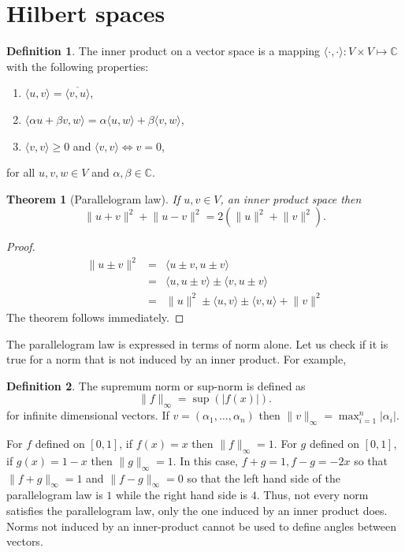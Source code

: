 \documentclass{article}
\theoremstyle{plain}
\newtheorem{thm}{Theorem}
\numberwithin{thm}{section}
\theoremstyle{plain}
\numberwithin{prop}{section}
\theoremstyle{definition}
\newtheorem{defn}{Definition}
\numberwithin{defn}{section}
\theoremstyle{remark}
\numberwithin{equation}{section}
\begin{document}
\section{Hilbert spaces}\label{s3}
\begin{defn}\label{s3d1}
The inner product on a vector space is a mapping $\langle\cdot,\cdot\rangle:
V \times V \mapsto \mathbb{C}$ with the following properties:
\begin{enumerate}
\item $\langle u, v\rangle = \overline{\langle v, u\rangle}$,
\item $\langle \alpha u + \beta v, w\rangle = \alpha\langle u, w\rangle +
\beta\langle v, w\rangle$,
\item $\langle v, v\rangle \ge 0$ and $\langle v, v\rangle \Leftrightarrow v=0$,
\end{enumerate}
for all $u, v, w \in V$ and $\alpha, \beta \in \mathbb{C}$.
\end{defn}

\begin{thm}[Parallelogram law]\label{s3t1}
If $u, v \in V$, an inner product space then
\[
\lVert u + v \rVert^2 + \lVert u - v\rVert^2 = 2(\lVert u \rVert^2 + \lVert v
\rVert^2).
\]
\end{thm}
\begin{proof}
\begin{eqnarray*}
\lVert u \pm v \rVert^2 &=& \langle u \pm v, u \pm v\rangle \\
 &=& \langle u, u \pm v \rangle \pm \langle v, u \pm v\rangle \\
 &=& \lVert u \rVert^2 \pm \langle u, v\rangle \pm \langle v, u\rangle +
     \lVert v \rVert^2
\end{eqnarray*}     
The theorem follows immediately.
\end{proof}

The parallelogram law is expressed in terms of norm alone. Let us check if it
is true for a norm that is not induced by an inner product. For example,
\begin{defn}\label{s3d2}
The supremum norm or sup-norm is defined as 
\[
\lVert f \rVert_\infty = \sup(|f(x)|).
\]
for infinite dimensional vectors. If $v = (\alpha_1, \ldots, \alpha_n)$ then
$\lVert v \rVert_\infty = \max_{i=1}^n|\alpha_i|$.
\end{defn}
For $f$ defined on $[0, 1]$, if $f(x) = x$ then $\lVert f \rVert_\infty = 1$.
For $g$ defined on $[0, 1]$, if $g(x) = 1-x$ then $\lVert g \rVert_\infty = 1$.
In this case, $f + g = 1, f - g = -2x$ so that $\lVert f + g\lVert_\infty = 1$
and $\lVert f - g\rVert_\infty = 0$ so that the left hand side of the 
parallelogram law is $1$ while the right hand side is $4$. Thus, not every norm
satisfies the parallelogram law, only the one induced by an inner product does.
Norms not induced by an inner-product cannot be used to define angles between
vectors.
\end{document}
